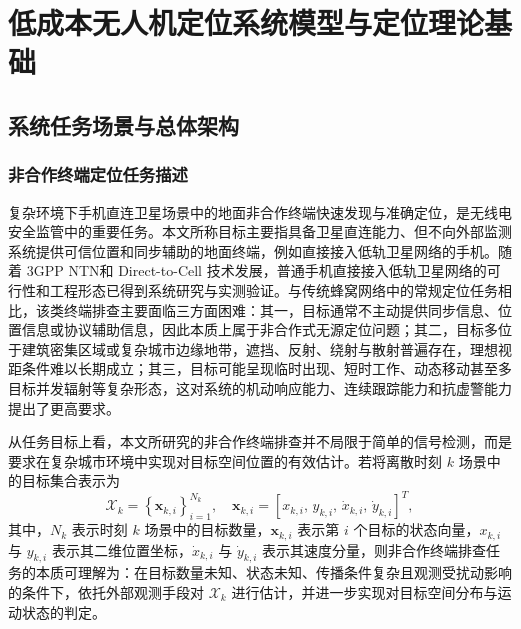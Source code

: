 \chapter{低成本无人机定位系统模型与定位理论基础}
\label{ch:fundamentals}

\section{系统任务场景与总体架构}
\label{sec:2_1}

\subsection{非合作终端定位任务描述}
\label{subsec:2_1_1}

复杂环境下手机直连卫星场景中的地面非合作终端快速发现与准确定位，是无线电安全监管中的重要任务。本文所称目标主要指具备卫星直连能力、但不向外部监测系统提供可信位置和同步辅助的地面终端，例如直接接入低轨卫星网络的手机。随着 3GPP NTN和 Direct-to-Cell 技术发展，普通手机直接接入低轨卫星网络的可行性和工程形态已得到系统研究与实测验证\cite{Lin2021NTN,He2024DirectSmartphone,GarciaCabeza2025DirectToCell}。与传统蜂窝网络中的常规定位任务相比，该类终端排查主要面临三方面困难：其一，目标通常不主动提供同步信息、位置信息或协议辅助信息，因此本质上属于非合作式无源定位问题\cite{Torrieri1984PassiveLocation}；其二，目标多位于建筑密集区域或复杂城市边缘地带，遮挡、反射、绕射与散射普遍存在，理想视距条件难以长期成立；其三，目标可能呈现临时出现、短时工作、动态移动甚至多目标并发辐射等复杂形态，这对系统的机动响应能力、连续跟踪能力和抗虚警能力提出了更高要求\cite{Wymeersch2009CooperativeLocalization}。

从任务目标上看，本文所研究的非合作终端排查并不局限于简单的信号检测，而是要求在复杂城市环境中实现对目标空间位置的有效估计。若将离散时刻 $k$ 场景中的目标集合表示为
\begin{equation}
\mathcal{X}_{k}
=
\left\{
\mathbf{x}_{k,i}
\right\}_{i=1}^{N_k},
\quad
\mathbf{x}_{k,i}
=
\left[
x_{k,i},\,
y_{k,i},\,
\dot{x}_{k,i},\,
\dot{y}_{k,i}
\right]^T,
\label{eq:2_1_target_state}
\end{equation}
其中，$N_k$ 表示时刻 $k$ 场景中的目标数量，$\mathbf{x}_{k,i}$ 表示第 $i$ 个目标的状态向量，$x_{k,i}$ 与 $y_{k,i}$ 表示其二维位置坐标，$\dot{x}_{k,i}$ 与 $\dot{y}_{k,i}$ 表示其速度分量，则非合作终端排查任务的本质可理解为：在目标数量未知、状态未知、传播条件复杂且观测受扰动影响的条件下，依托外部观测手段对 $\mathcal{X}_k$ 进行估计，并进一步实现对目标空间分布与运动状态的判定。

